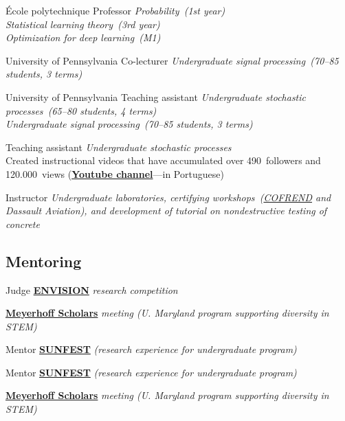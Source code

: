 \documentclass{cvlfoc}
\begin{document}
\begin{entrydate}
		{\'{E}cole polytechnique}
		{Professor}
		{\emph{
		Probability~(1st year)\\
		Statistical learning theory~(3rd year)\\
		Optimization for deep learning~(M1)
		}}

		{University of Pennsylvania}
		{Co-lecturer}
		{\emph{Undergraduate signal processing~(70--85 students, 3 terms)}}

		{University of Pennsylvania}
		{Teaching assistant}
		{\emph{Undergraduate stochastic processes~(65--80 students, 4 terms)\\
		Undergraduate signal processing~(70--85 students, 3 terms)}}

		{Teaching assistant}
		{\emph{Undergraduate stochastic processes}\\
		Created instructional videos that have accumulated over
		490~followers and\\120.000~views
		(\href{https://www.youtube.com/@videos-aleatorios}{\textbf{Youtube channel}}---in Portuguese)}

		{Instructor}
		{\emph{Undergraduate laboratories, certifying workshops~(\href{https://www.cofrend.com}{\emph{COFREND}}
		and \emph{Dassault Aviation}), and development of tutorial on nondestructive
		testing of concrete}}
\end{entrydate}


\subsection*{Mentoring}

\begin{entrydate}
		{Judge}
		{\href{http://envisionrc.com/}{\textbf{ENVISION}}
			\emph{research competition}}

		{}
		{\href{https://meyerhoff.umbc.edu/}{\textbf{Meyerhoff Scholars}}
			\emph{meeting (U. Maryland program supporting diversity in STEM)}}

		{Mentor}
		{\href{https://sunfest.seas.upenn.edu}{\textbf{SUNFEST}}
			\emph{(research experience for undergraduate program)}}

		{Mentor}
		{\href{https://sunfest.seas.upenn.edu}{\textbf{SUNFEST}}
			\emph{(research experience for undergraduate program)}}

		{}
		{\href{https://meyerhoff.umbc.edu/}{\textbf{Meyerhoff Scholars}}
			\emph{meeting (U. Maryland program supporting diversity in STEM)}}
\end{entrydate}
\end{document}
